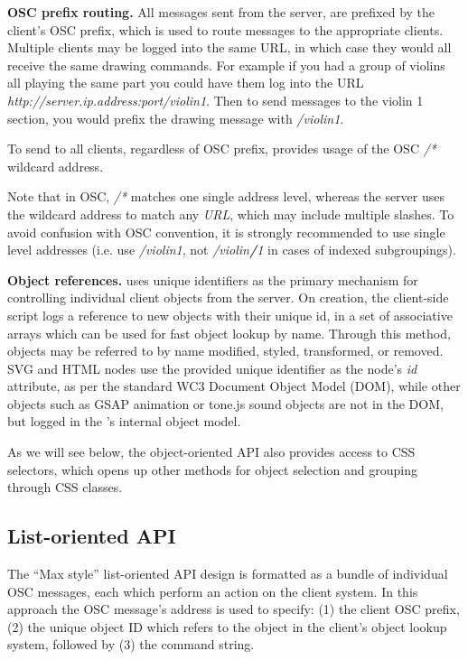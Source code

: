 \medskip
\noindent
\textbf{OSC prefix routing.}  
All messages sent from the server, are prefixed by the client's OSC prefix, which is used to route messages to the appropriate clients. 
Multiple clients may be logged into the same URL, in which case they would all receive the same drawing commands. 
For example if you had a group of violins all playing the same part you could have them log into the URL \textit{http://server.ip.address:port/violin1}.
Then to send messages to the violin 1 section, you would prefix the drawing message with \textit{/violin1}.

To send to all clients, regardless of OSC prefix, \drawsocket provides usage of the OSC \textit{/*} wildcard address.

Note that in OSC, \textit{/*} matches one single address level, whereas the \drawsocket server uses the wildcard address to match any \textit{URL}, which may include multiple slashes.
To avoid confusion with OSC convention, it is strongly recommended to use single level addresses (i.e. use \textit{/violin1}, not \textit{/violin\textbf{/}1} in cases of indexed subgroupings).

\medskip
\noindent
\textbf{Object references.} 
\drawsocket uses unique identifiers as the primary mechanism for controlling individual client objects from the server.
On creation, the client-side script logs a reference to new objects with their unique id, in a set of associative arrays which can be used for fast object lookup by name. 
Through this method, objects may be referred to by name modified, styled, transformed, or removed.
SVG and HTML nodes use the provided unique identifier as the node's \textit{id} attribute, as per the standard WC3 Document Object Model (DOM)\cite{Champion:04:DOM}, while other objects such as GSAP animation or tone.js sound objects are not in the DOM, but logged in the \drawsocket's internal object model.

As we will see below, the object-oriented API also provides access to CSS selectors, which opens up other methods for object selection and grouping through CSS classes.


\subsection{List-oriented API}\label{sec:maxstyle}
The ``Max style'' list-oriented API design is formatted as a bundle of individual OSC messages, each which perform an action on the client system. 
In this approach the OSC message's address is used to specify: (1) the client OSC prefix, (2) the unique object ID which refers to the object in the client's object lookup system, followed by (3) the command string.

